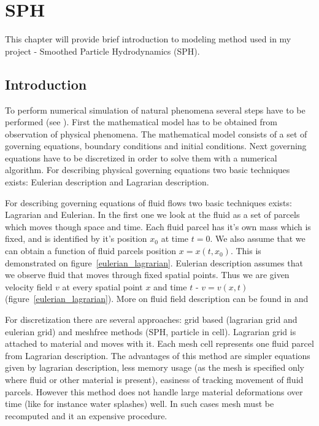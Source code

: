 

\chapter{SPH}
\label{chap:sph}


\graphicspath{{sph/figures/}}

This chapter will provide brief introduction to modeling method used in my project - Smoothed Particle Hydrodynamics (SPH).


\section{Introduction}
To perform numerical simulation of natural phenomena several steps have to be performed (see \cite[section 1.1.2]{Liu}). First the mathematical model has to be obtained from observation of physical phenomena. The mathematical model consists of a set of governing equations, boundary conditions and initial conditions. Next governing equations have to be discretized in order to solve them with a numerical algorithm.
For describing physical governing equations two basic techniques exists: Eulerian description and Lagrarian description.

For describing governing equations of fluid flows two basic techniques exists: Lagrarian and Eulerian. In the first one we look at the fluid as a set of parcels which moves though space and time. Each fluid parcel has it's own mass which is fixed, and is identified by it's position $x_0$ at time $t = 0$. We also assume that we can obtain a function of fluid parcels position $x = x(t, x_0)$. This is demonstrated on figure~\ref{eulerian_lagrarian}.
Eulerian description assumes that we observe fluid that moves through fixed spatial points. Thus we are given velocity field $v$ at every spatial point $x$ and time $t$ - $v = v(x, t)$ (figure~\ref{eulerian_lagrarian}). 
More on fluid field description can be found in \cite[section 2.1]{Hauke2008} and \cite{Price06}


For discretization there are several approaches: grid based (lagrarian grid and eulerian grid) and meshfree methods (SPH, particle in cell).
Lagrarian grid is attached to material and moves with it. Each mesh cell represents one fluid parcel from Lagrarian description. The advantages of this method are simpler equations given by lagrarian description, less memory usage (as the mesh is specified only where fluid or other material is present), easiness of tracking movement of fluid parcels. However this method does not handle large material deformations over time (like for instance water splashes) well. In such cases mesh must be recomputed and it an expensive procedure.

